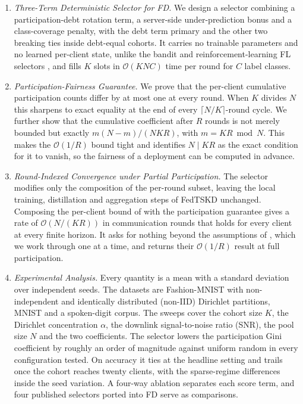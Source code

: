 \documentclass[journal]{IEEEtran}
\newcommand{\rev}[1]{#1}
\begin{document}
\begin{enumerate}
    \item \textit{Three-Term Deterministic Selector for FD.} We design a selector combining a participation-debt rotation term, a server-side under-prediction bonus and a class-coverage penalty, with the debt term primary and the other two breaking ties inside debt-equal cohorts. It carries no trainable parameters and no learned per-client state, unlike the bandit and reinforcement-learning FL selectors \rev{\cite{kazemi2026robust, xia2020mab}}, and fills $K$ slots in $\mathcal{O}(KNC)$ time per round for $C$ label classes.

    \item \textit{Participation-Fairness Guarantee.} We prove that the per-client cumulative participation counts differ by at most one at every round. When $K$ divides $N$ this sharpens to exact equality at the end of every $\lceil N/K \rceil$-round cycle. \rev{We further show that the cumulative coefficient after $R$ rounds is not merely bounded but exactly $m(N-m)/(NKR)$, with $m = KR \bmod N$. This makes the $\mathcal{O}(1/R)$ bound tight and identifies $N \mid KR$ as the exact condition for it to vanish, so the fairness of a deployment can be computed in advance.}

    \item \textit{\rev{Round-Indexed Convergence under Partial Participation.}} The selector modifies only the composition of the per-round subset, leaving the local training, distillation and aggregation steps of FedTSKD \cite{mu2024fedtskd} unchanged. \rev{Composing the per-client bound of \cite{mu2024fedtskd} with the participation guarantee gives a rate of $\mathcal{O}(N/(KR))$ in communication rounds that holds for every client at every finite horizon. It asks for nothing beyond the assumptions of \cite{mu2024fedtskd}, which we work through one at a time, and returns their $\mathcal{O}(1/R)$ result at full participation.}

    \item \textit{Experimental Analysis.} \rev{Every quantity is a mean with a standard deviation over independent seeds. The datasets are Fashion-MNIST with non-independent and identically distributed (non-IID) Dirichlet partitions, MNIST and a spoken-digit corpus. The sweeps cover the cohort size $K$, the Dirichlet concentration $\alpha$, the downlink signal-to-noise ratio (SNR), the pool size $N$ and the two coefficients. The selector lowers the participation Gini coefficient by roughly an order of magnitude against uniform random in every configuration tested. On accuracy it ties at the headline setting and trails once the cohort reaches twenty clients, with the sparse-regime differences inside the seed variation. A four-way ablation separates each score term, and four published selectors ported into FD serve as comparisons.}
\end{enumerate}
\end{document}
